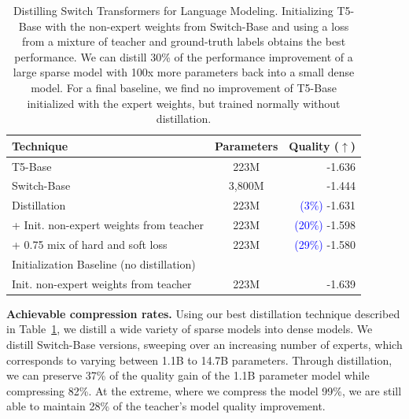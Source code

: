 \documentclass[twoside,11pt]{article}
\begin{document}
\begin{center}
\begin{table}[h!]
    \centering
\begin{tabular}{lcr}
    \toprule
    {Technique} & {Parameters} & {Quality ($\uparrow$)} \\
    \hline
    T5-Base & 223M & -1.636  \\
    Switch-Base & 3,800M & -1.444  \\
    \hline
    Distillation & 223M &  \textcolor{blue}{(3\%)} -1.631 \\
    + Init. non-expert weights from teacher & 223M & \textcolor{blue}{(20\%)} -1.598  \\
    + 0.75 mix of hard and soft loss & 223M & \textcolor{blue}{(29\%)} -1.580 \\
    \hline
    Initialization Baseline (no distillation) & & \\
    Init. non-expert weights from teacher & 223M & -1.639 \\ 
    \bottomrule
\end{tabular}
\caption{Distilling Switch Transformers for Language Modeling. 
Initializing T5-Base with the non-expert weights from Switch-Base and using a loss from a mixture of teacher and ground-truth labels obtains the best performance. 
We can distill 30\% of the performance improvement of a large sparse model with 100x more parameters back into a small dense model.
For a final baseline, we find no improvement of T5-Base initialized with the expert weights, but trained normally without distillation.}
\label{tab:distillation_ablation}
\end{table}
\end{center}

\textbf{Achievable compression rates.} 
Using our best distillation technique described in Table~\ref{tab:distillation_ablation}, we distill a wide variety of sparse models into dense models.
We distill Switch-Base versions, sweeping over an increasing number of experts, which corresponds to varying between 1.1B to 14.7B parameters.
Through distillation, we can preserve 37\% of the quality gain of the 1.1B parameter model while compressing 82\%.
At the extreme, where we compress the model 99\%, we are still able to maintain 28\% of the teacher's model quality improvement.
    
\end{document}
